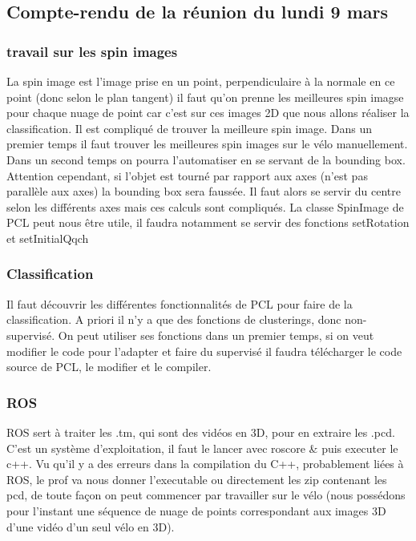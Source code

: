 \subsection{Compte-rendu de la réunion du lundi 9 mars}

\subsubsection{travail sur les spin images}

La spin image est l’image prise en un point, perpendiculaire à la normale en ce point (donc selon le plan tangent)
il faut qu’on prenne les meilleures spin imagse pour chaque nuage de point car c’est sur ces images 2D que nous allons réaliser la classification. Il est compliqué de trouver la meilleure spin image. Dans un premier temps il faut trouver les meilleures spin images sur le vélo manuellement. Dans un second temps on pourra l’automatiser en se servant de la bounding box. Attention cependant, si l’objet est tourné par rapport aux axes (n’est pas parallèle aux axes) la bounding box sera faussée. Il faut alors se servir du centre selon les différents axes mais ces calculs sont compliqués.
La classe SpinImage de PCL peut nous être utile, il faudra notamment se servir des fonctions setRotation et setInitialQqch

\subsubsection{ Classification}

Il faut découvrir les différentes fonctionnalités de PCL pour faire de la classification. A priori il n’y a que des fonctions de clusterings, donc non-supervisé. On peut utiliser ses fonctions dans un premier temps, si on veut modifier le code pour l’adapter et faire du supervisé il faudra télécharger le code source de PCL, le modifier et le compiler.

\subsubsection{ROS}

ROS sert à traiter les .tm, qui sont des vidéos en 3D, pour en extraire les .pcd. C’est un système d’exploitation, il faut le lancer avec roscore \& puis executer le c++. Vu qu’il y a des erreurs dans la compilation du C++, probablement liées à ROS, le prof va nous donner l’executable ou directement les zip contenant les pcd, de toute façon on peut commencer par travailler sur le vélo (nous possédons pour l’instant une séquence de nuage de points correspondant aux images 3D d’une vidéo d’un seul vélo en 3D).

